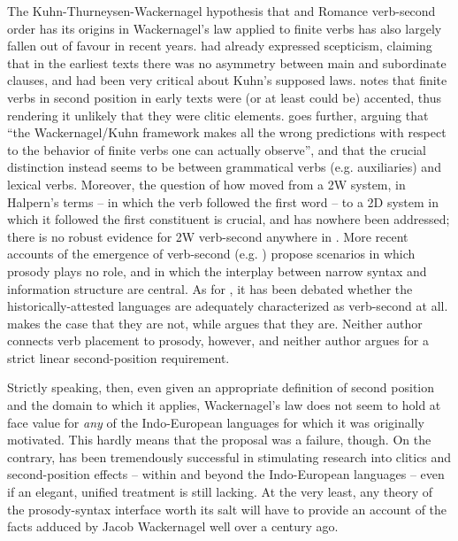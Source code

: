 The Kuhn-Thurneysen-Wackernagel hypothesis that  and Romance verb-second order has its origins in Wackernagel's law applied to finite verbs has also largely fallen out of favour in recent years. \citet[23--24, 315--318]{Ries1907} had already expressed scepticism, claiming that in the earliest texts there was no asymmetry between main and subordinate clauses, and \citet{Fourquet1938} had been very critical about Kuhn's supposed laws. \citet[159]{Kiparsky1995} notes that finite verbs in second position in early  texts were (or at least could be) accented, thus rendering it unlikely that they were clitic elements. \citet[158]{Getty1997} goes further, arguing that ``the Wackernagel/Kuhn framework makes all the wrong predictions with respect to the behavior of finite verbs one can actually observe'', and that the crucial distinction instead seems to be between grammatical verbs (e.g. auxiliaries) and lexical verbs. Moreover, the question of how  moved from a 2W system, in Halpern's \citeyearpar{Halpern1995} terms -- in which the verb followed the first word -- to a 2D system in which it followed the first constituent is crucial, and has nowhere been addressed; there is no robust evidence for 2W verb-second anywhere in . More recent accounts of the emergence of verb-second (e.g. \citet{HinterhoelzlPetrova2010,Walkden2012,Walkden2014book,Walkden2015,Walkden2017}) propose scenarios in which prosody plays no role, and in which the interplay between narrow syntax and information structure are central. As for , it has been debated whether the historically-attested languages are adequately characterized as verb-second at all. \citet{Kaiser2002} makes the case that they are not, while \citet{Wolfe2018} argues that they are. Neither author connects verb placement to prosody, however, and neither author argues for a strict linear second-position requirement.

Strictly speaking, then, even given an appropriate definition of second position and the domain to which it applies, Wackernagel's law does not seem to hold at face value for \emph{any} of the Indo-European languages for which it was originally motivated. This hardly means that the proposal was a failure, though. On the contrary, \citet{Wackernagel1892} has been tremendously successful in stimulating research into clitics and second-position effects -- within and beyond the Indo-European languages -- even if an elegant, unified treatment is still lacking. At the very least, any theory of the prosody-syntax interface worth its salt will have to provide an account of the facts adduced by Jacob Wackernagel well over a century ago.


